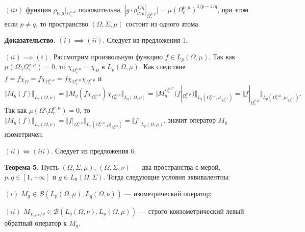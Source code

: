 \documentclass[11pt,twoside]{article}
\begin{document}
    $(iii)$ функция $\rho_{\nu,\mu}|_{\Omega_c^{\nu,\mu}}$ положительна,
    $|g\cdot
    \rho_{\nu,\mu}^{1/q}|_{\Omega_c^{\nu,\mu}}|
    ={\mu(\Omega_c^{\nu,\mu})}^{1/p-1/q}$,
        при этом если $p\neq q$, то пространство $(\Omega,\Sigma,\mu)$ состоит из
        одного атома.

        \textbf{Доказательство.} $(i)$$\implies$$ (ii)$. Следует из предложения
        1.

    $(ii)$$\implies$$ (i)$. Рассмотрим произвольную функцию $f\in
    L_p(\Omega,\mu)$. Так как $\mu(\Omega\setminus\Omega_c^{\nu,\mu})=0$, то
    $\chi_{\Omega_c^{\nu,\mu}}=\chi_{\Omega}$ в $L_p(\Omega,\mu)$. Как
        следствие $f=f\chi_{\Omega}
    =f\chi_{\Omega_c^{\nu,\mu}}
    =f\chi_{\Omega_c^{\nu,\mu}}\chi_{\Omega_c^{\nu,\mu}}$
и
$$
    \Vert M_g(f)\Vert_{L_q(\Omega,\nu)}
    =\Vert
    M_g(f\chi_{\Omega_c^{\nu,\mu}})\chi_{\Omega_c^{\nu,\mu}}
    \Vert_{L_q(\Omega,\nu)}
    =\Vert M_g^{\Omega_c^{\nu,\mu}}(f|_{\Omega_c^{\nu,\mu}})
    \Vert_{L_q(\Omega_c^{\nu,\mu},\nu|_{\Omega_c^{\nu,\mu}})}
    =\Vert
    f|_{\Omega_c^{\nu,\mu}}
    \Vert_{L_p(\Omega_c^{\nu,\mu},\mu|_{\Omega_c^{\nu,\mu}})}.
$$
Так как $\mu(\Omega\setminus\Omega_c^{\nu,\mu})=0$, то $\Vert
    M_g(f)\Vert_{L_q(\Omega,\nu)}= \Vert f|_{\Omega_c^{\nu,\mu}}
    \Vert_{L_p(\Omega_c^{\nu,\mu},\mu|_{\Omega_c^{\nu,\mu}})}=\Vert
    f\Vert_{L_p(\Omega,\mu)}$, значит оператор $M_g$ изометричен.

$(ii)\Longleftrightarrow (iii)$. Следует из предложения 6.

\textbf{Теорема 5.} Пусть $(\Omega,\Sigma,\mu)$, $(\Omega,\Sigma,\nu)$ --- два
пространства с мерой, $p,q\in[1,+\infty]$ и $g\in L_0(\Omega,\Sigma)$. Тогда
следующие условия эквивалентны:

$(i)$ $M_g\in\mathcal{B}(L_p(\Omega,\mu),L_q(\Omega,\nu))$ --- изометрический
оператор;

$(ii)$ $M_{\chi_{\Omega_c^{\nu,\mu}}/g}\in\mathcal{B}(L_q(\Omega,\nu),
    L_p(\Omega,\mu))$ --- строго коизометрический левый обратный оператор к
$M_g$.
\end{document}

